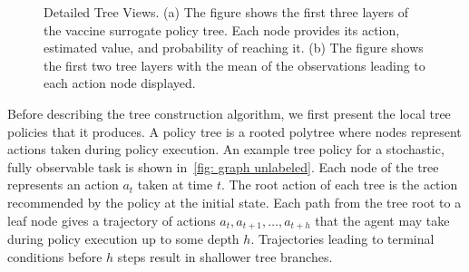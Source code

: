 \documentclass[letterpaper]{article} %
\begin{document}
\begin{figure}[ht!]
\begin{subfigure}[t]{0.43\textwidth}
    \caption{}\label{fig: detail b}
    \end{subfigure}
    \caption{Detailed Tree Views. (a) The figure shows the first three layers of the vaccine surrogate policy tree. Each node provides its action, estimated value, and probability of reaching it. (b) The figure shows the first two tree layers with the mean of the observations leading to each action node displayed.
        }
    \label{fig: example graph}
\end{figure}
Before describing the tree construction algorithm, we first present the local tree policies that it produces. 
A policy tree is a rooted polytree where nodes represent actions taken during policy execution. 
An example tree policy for a stochastic, fully observable task is shown in~\cref{fig: graph unlabeled}.
Each node of the tree represents an action $a_t$ taken at time $t$.
The root action of each tree is the action recommended by the policy at the initial state.
Each path from the tree root to a leaf node gives a trajectory of actions $a_t, a_{t+1}, \dots, a_{t + h}$ that the agent may take during policy execution up to some depth $h$.
Trajectories leading to terminal conditions before $h$ steps result in shallower tree branches. 
\end{document}
